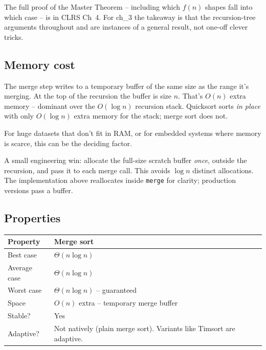 \documentclass[11pt]{article}
\begin{document}
\begin{notebox}
The full proof of the Master Theorem -- including which $f(n)$ shapes
fall into which case -- is in CLRS Ch~4. For ch\_3 the takeaway is
that the recursion-tree arguments throughout  and
 are instances of a general result, not one-off
clever tricks.
\end{notebox}

\subsection{Memory cost}

\begin{warnbox}
The merge step writes to a temporary buffer of the same size as the
range it's merging. At the top of the recursion the buffer is size
$n$. That's $O(n)$ extra memory -- dominant over the $O(\log n)$
recursion stack. Quicksort sorts \emph{in place} with only $O(\log n)$
extra memory for the stack; merge sort does not.

For huge datasets that don't fit in RAM, or for embedded systems
where memory is scarce, this can be the deciding factor.
\end{warnbox}

\begin{notebox}
A small engineering win: allocate the full-size scratch buffer
\emph{once}, outside the recursion, and pass it to each merge call.
This avoids $\log n$ distinct allocations. The implementation above
reallocates inside \texttt{merge} for clarity; production versions
pass a buffer.
\end{notebox}

\subsection{Properties}

\begin{center}
\footnotesize
\renewcommand{\arraystretch}{1.3}
\begin{tabular}{@{}ll@{}}
\hline
\textbf{Property} & \textbf{Merge sort} \\
\hline
Best case         & $\Theta(n \log n)$ \\
Average case      & $\Theta(n \log n)$ \\
Worst case        & $\Theta(n \log n)$ -- guaranteed \\
Space             & $O(n)$ extra -- temporary merge buffer \\
Stable?           & Yes \\
Adaptive?         & Not natively (plain merge sort). Variants
                    like Timsort are adaptive. \\
\hline
\end{tabular}
\end{center}
\end{document}
